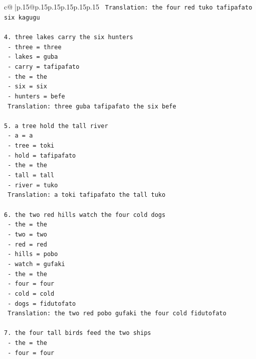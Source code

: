 \documentclass{article}
\begin{document}
{\begin{supertabular}{c@{$\;$}|p{.15\linewidth}@{}p{.15\linewidth}p{.15\linewidth}p{.15\linewidth}p{.15\linewidth}p{.15\linewidth}}
{{{\texttt{   Translation: the four red tuko tafipafato six kagugu} \\
\\ 
\texttt{4. three lakes carry the six hunters} \\
\texttt{   {-} three = three} \\
\texttt{   {-} lakes = guba} \\
\texttt{   {-} carry = tafipafato} \\
\texttt{   {-} the = the} \\
\texttt{   {-} six = six} \\
\texttt{   {-} hunters = befe} \\
\texttt{   Translation: three guba tafipafato the six befe} \\
\\ 
\texttt{5. a tree hold the tall river} \\
\texttt{   {-} a = a} \\
\texttt{   {-} tree = toki} \\
\texttt{   {-} hold = tafipafato} \\
\texttt{   {-} the = the} \\
\texttt{   {-} tall = tall} \\
\texttt{   {-} river = tuko} \\
\texttt{   Translation: a toki tafipafato the tall tuko} \\
\\ 
\texttt{6. the two red hills watch the four cold dogs} \\
\texttt{   {-} the = the} \\
\texttt{   {-} two = two} \\
\texttt{   {-} red = red} \\
\texttt{   {-} hills = pobo} \\
\texttt{   {-} watch = gufaki} \\
\texttt{   {-} the = the} \\
\texttt{   {-} four = four} \\
\texttt{   {-} cold = cold} \\
\texttt{   {-} dogs = fidutofato} \\
\texttt{   Translation: the two red pobo gufaki the four cold fidutofato} \\
\\ 
\texttt{7. the four tall birds feed the two ships} \\
\texttt{   {-} the = the} \\
\texttt{   {-} four = four} \\
}}}
\end{supertabular}}
\end{document}
